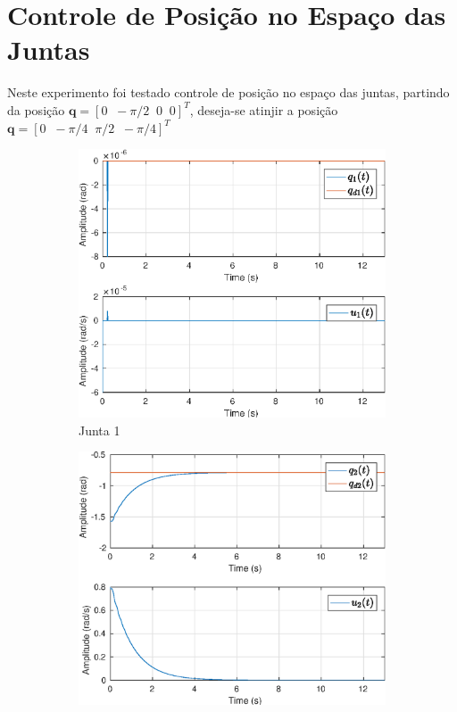 \section{Controle de Posição no Espaço das Juntas}

Neste experimento foi testado controle de posição no espaço das juntas, partindo da posição $\bm{q} =[ 0 \;\; -\pi/2 \;\; 0 \;\; 0]^T$, deseja-se atinjir a posição $\bm{q} =[ 0 \;\; -\pi/4 \;\; \pi/2  \;\; -\pi/4]^T$
\begin{figure}[H]
\centering
\begin{subfigure}{.5\textwidth}
  \centering
  \includegraphics[width=\linewidth]{./img/joint_test1/q1.eps}
  \caption{Junta 1}
  \label{fig:sub1}
\end{subfigure}%
\begin{subfigure}{.5\textwidth}
  \centering
  \includegraphics[width=\linewidth]{./img/joint_test1/q2.eps}

\end{subfigure}
\end{figure}
